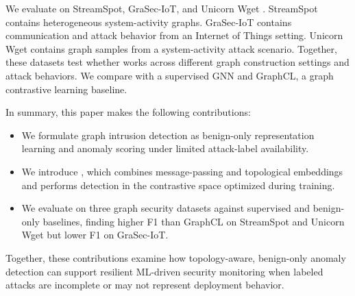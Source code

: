 We evaluate \sysname on StreamSpot, GraSec-IoT, and Unicorn Wget \cite{manzoor2016streamspot,hamouche2024graseciot,unicornwget}. StreamSpot contains heterogeneous system-activity graphs. GraSec-IoT contains communication and attack behavior from an Internet of Things setting. Unicorn Wget contains graph samples from a system-activity attack scenario. Together, these datasets test whether \sysname works across different graph construction settings and attack behaviors. We compare \sysname with a supervised GNN and GraphCL, a graph contrastive learning baseline.

In summary, this paper makes the following contributions:
\begin{itemize}
    \item We formulate graph intrusion detection as benign-only representation learning and anomaly scoring under limited attack-label availability.
    \item We introduce \sysname, which combines message-passing and topological embeddings and performs detection in the contrastive space optimized during training.
    \item We evaluate \sysname on three graph security datasets against supervised and benign-only baselines, finding higher F1 than GraphCL on StreamSpot and Unicorn Wget but lower F1 on GraSec-IoT.
\end{itemize}

Together, these contributions examine how topology-aware, benign-only anomaly detection can support resilient ML-driven security monitoring when labeled attacks are incomplete or may not represent deployment behavior.

